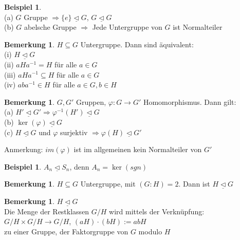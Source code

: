 \documentclass[10pt,a4paper,numbers=endperiod]{scrreprt}
\theoremstyle{definition}
\newtheorem{bem}[satz]{Bemerkung}
\newtheorem{bsp}[satz]{Beispiel}
\begin{document}
\begin{bsp}
	$ $\\
	(a) $G$ Gruppe $\Rightarrow \{e\} \underline{\vartriangleleft} G$, $G \underline{\vartriangleleft} G$\\
	(b) $G$ abelsche Gruppe $\Rightarrow$ Jede Untergruppe von $G$ ist Normalteiler
\end{bsp}

\begin{bem}
	$H \subseteq G$ Untergruppe. Dann sind äquivalent:\\
	(i) $H \underline{\vartriangleleft} G$\\
	(ii) $aHa^{-1} = H$ für alle $a \in G$\\
	(iii) $aHa^{-1} \subseteq H$ für alle $a \in G$\\
	(iv) $aba^{-1} \in H$ für alle $a \in G, b \in H$
\end{bem}

\begin{bem}
	$G, G'$ Gruppen, $\varphi: G \rightarrow G'$ Homomorphismus. Dann gilt:\\
	(a) $H' \underline{\vartriangleleft} G' \Rightarrow \varphi^{-1} (H') \underline{\vartriangleleft} G$\\
	(b) $\ker(\varphi) \underline{\vartriangleleft} G$\\
	(c) $H \underline{\vartriangleleft} G$ und $\varphi$ surjektiv $\Rightarrow \varphi(H) \underline{\vartriangleleft} G'$ 
\end{bem}

Anmerkung: $im(\varphi)$ ist im allgemeinen kein Normalteiler von $G'$

\begin{bsp}
	$A_n \underline{\vartriangleleft} S_n$, denn $A_n = \ker(sgn)$
\end{bsp}

\begin{bem}
	$H \subseteq G$ Untergruppe, mit $(G:H)= 2$. Dann ist $H \underline{\vartriangleleft} G$
\end{bem}

\begin{bem}
	$H \underline{\vartriangleleft} G$\\
	Die Menge der Restklassen $G/H$ wird mittels der Verknüpfung:\\
	$G/H \times G/H \rightarrow G/H$, $(aH) \cdot(bH) := abH$\\
	zu einer Gruppe, der Faktorgruppe von $G$ modulo $H$
\end{bem}
\end{document}
